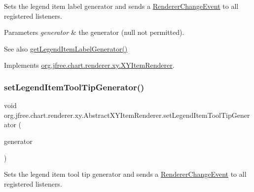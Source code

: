 Sets the legend item label generator and sends a \mbox{\hyperlink{}{Renderer\+Change\+Event}} to all registered listeners.


\begin{DoxyParams}{Parameters}
{\em generator} & the generator ({\ttfamily null} not permitted).\\
\hline
\end{DoxyParams}
\begin{DoxySeeAlso}{See also}
\mbox{\hyperlink{classorg_1_1jfree_1_1chart_1_1renderer_1_1xy_1_1_abstract_x_y_item_renderer_adb671043619b9b91070ddb7c8554618a}{get\+Legend\+Item\+Label\+Generator()}} 
\end{DoxySeeAlso}


Implements \mbox{\hyperlink{interfaceorg_1_1jfree_1_1chart_1_1renderer_1_1xy_1_1_x_y_item_renderer_ad57737bb623ca88dec6dd3fb90a3e8fe}{org.\+jfree.\+chart.\+renderer.\+xy.\+X\+Y\+Item\+Renderer}}.

\mbox{\label{classorg_1_1jfree_1_1chart_1_1renderer_1_1xy_1_1_abstract_x_y_item_renderer_ab04c5790c9f85263421e49fd9359b98a}} 
\subsubsection{\texorpdfstring{set\+Legend\+Item\+Tool\+Tip\+Generator()}{setLegendItemToolTipGenerator()}}
{\footnotesize\ttfamily void org.\+jfree.\+chart.\+renderer.\+xy.\+Abstract\+X\+Y\+Item\+Renderer.\+set\+Legend\+Item\+Tool\+Tip\+Generator (\begin{DoxyParamCaption}\item[{\mbox{\hyperlink{interfaceorg_1_1jfree_1_1chart_1_1labels_1_1_x_y_series_label_generator}{X\+Y\+Series\+Label\+Generator}}}]{generator }\end{DoxyParamCaption})}

Sets the legend item tool tip generator and sends a \mbox{\hyperlink{}{Renderer\+Change\+Event}} to all registered listeners.


